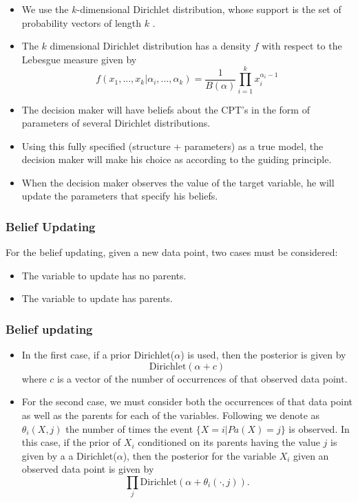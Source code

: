 \documentclass{beamer}
\theoremstyle{plain}
\begin{document}
\begin{frame}
\begin{itemize}
\item We use the $k$-dimensional Dirichlet distribution, whose support is the set of probability vectors of length $k$ \cite{hjort2010bayesian}. 
\item The $k$ dimensional Dirichlet distribution has a density $f$ with respect to the Lebesgue measure given by
\[ f(x_1,...,x_k | \alpha_i,...,\alpha_k)=\frac{1}{B(\alpha)}  \prod_{i=1}^k x_i^{\alpha_i-1}\]
\item The decision maker will have beliefs about the CPT's in the form of parameters of several Dirichlet distributions.
\item Using this fully specified (structure + parameters) as a true model, the decision maker will make his choice as according to the guiding principle.
\item When the decision maker observes the value of the target variable, he will update the parameters that specify his beliefs.
\end{itemize}
\end{frame}

\begin{frame}
\frametitle{Belief Updating}
For the belief updating, given a new data point,  two cases must be considered:
\begin{itemize}
\item The variable to update has no parents.
\item The variable to update has parents.
\end{itemize}
\end{frame}

\begin{frame}
\frametitle{Belief updating}
\begin{itemize}
\item In the first case, if a prior Dirichlet($\alpha$) is used, then the posterior is given by
\[ \textrm{Dirichlet}(\alpha + c) \]
where $c$ is a vector of the number of occurrences of that observed data point. 
\item For the second case, we must consider both the occurrences of that data point as well as the parents for each of the variables. Following \cite{barber2012bayesian} we denote as $\theta_i(X,j)$ the number of times the event $\{X=i | Pa(X)=j\}$ is observed. In this case, if the prior of $X_i$ conditioned on its parents having the value $j$ is given by a a Dirichlet($\alpha$), then the posterior for the variable $X_i$ given an observed data point is given by 
\[ \prod_j \textrm{Dirichlet}(\alpha + \theta_i(\cdot,j)). \]
\end{itemize}
\end{frame}
\end{document}

